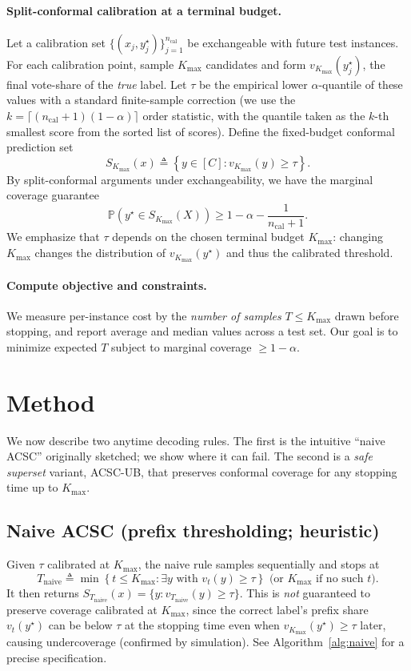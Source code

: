 \documentclass[11pt]{article}
\begin{document}
\paragraph{Split-conformal calibration at a terminal budget.}
Let a calibration set $\{(x_j, y^\star_j)\}_{j=1}^{n_{\text{cal}}}$ be exchangeable with future test instances.
For each calibration point, sample $K_{\max}$ candidates and form $v_{K_{\max}}(y^\star_j)$, the final vote-share of the \emph{true} label.
Let $\tau$ be the empirical lower $\alpha$-quantile of these values with a standard finite-sample correction (we use the $k=\lceil (n_{\text{cal}}+1)(1-\alpha)\rceil$ order statistic, with the quantile taken as the $k$-th smallest score from the sorted list of scores).
Define the fixed-budget conformal prediction set
\[
S_{K_{\max}}(x) \triangleq \left\{ y \in [C] : v_{K_{\max}}(y) \ge \tau \right\}.
\]
By split-conformal arguments under exchangeability, we have the marginal coverage guarantee
\[
\mathbb{P}\left( y^\star \in S_{K_{\max}}(X) \right) \ge 1 - \alpha - \frac{1}{n_{\text{cal}}+1}.
\]
We emphasize that $\tau$ depends on the chosen terminal budget $K_{\max}$: changing $K_{\max}$ changes the distribution of $v_{K_{\max}}(y^\star)$ and thus the calibrated threshold.

\paragraph{Compute objective and constraints.}
We measure per-instance cost by the \emph{number of samples} $T\le K_{\max}$ drawn before stopping, and report average and median values across a test set. Our goal is to minimize expected $T$ subject to marginal coverage $\ge 1-\alpha$.

\section{Method}
We now describe two anytime decoding rules. The first is the intuitive “naive ACSC” originally sketched; we show where it can fail. The second is a \emph{safe superset} variant, ACSC-UB, that preserves conformal coverage for any stopping time up to $K_{\max}$.

\subsection{Naive ACSC (prefix thresholding; heuristic)}
Given $\tau$ calibrated at $K_{\max}$, the naive rule samples sequentially and stops at
\[
T_{\text{naive}} \triangleq \min\left\{t \le K_{\max}: \exists y \text{ with } v_t(y) \ge \tau \right\} \text{ (or } K_{\max} \text{ if no such $t$).}
\]
It then returns $S_{T_{\text{naive}}}(x) = \{y : v_{T_{\text{naive}}}(y) \ge \tau\}$.
This is \emph{not} guaranteed to preserve coverage calibrated at $K_{\max}$, since the correct label’s prefix share $v_t(y^\star)$ can be below $\tau$ at the stopping time even when $v_{K_{\max}}(y^\star) \ge \tau$ later, causing undercoverage (confirmed by simulation). See Algorithm~\ref{alg:naive} for a precise specification.
\end{document}
